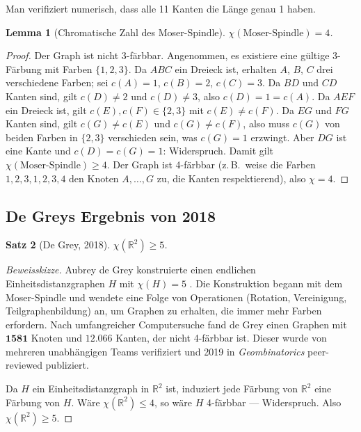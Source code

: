 \documentclass[12pt,a4paper]{amsart}
\newtheorem{theorem}{Satz}[section]
\newtheorem{lemma}[theorem]{Lemma}
\theoremstyle{definition}
\theoremstyle{remark}
\newcommand{\R}{\mathbb{R}}
\newcommand{\chr}{\chi}
\begin{document}
Man verifiziert numerisch, dass alle 11 Kanten die Länge genau 1 haben.

\begin{lemma}[Chromatische Zahl des Moser-Spindle]
$\chr(\text{Moser-Spindle}) = 4$.
\end{lemma}

\begin{proof}
Der Graph ist nicht 3-färbbar. Angenommen, es existiere eine gültige
3-Färbung mit Farben $\{1, 2, 3\}$. Da $ABC$ ein Dreieck ist, erhalten
$A$, $B$, $C$ drei verschiedene Farben; sei $c(A) = 1$, $c(B) = 2$,
$c(C) = 3$. Da $BD$ und $CD$ Kanten sind, gilt $c(D) \ne 2$ und
$c(D) \ne 3$, also $c(D) = 1 = c(A)$. Da $AEF$ ein Dreieck ist, gilt
$c(E), c(F) \in \{2, 3\}$ mit $c(E) \ne c(F)$. Da $EG$ und $FG$ Kanten
sind, gilt $c(G) \ne c(E)$ und $c(G) \ne c(F)$, also muss $c(G)$ von
beiden Farben in $\{2,3\}$ verschieden sein, was $c(G) = 1$ erzwingt.
Aber $DG$ ist eine Kante und $c(D) = c(G) = 1$: Widerspruch. Damit gilt
$\chr(\text{Moser-Spindle}) \ge 4$. Der Graph ist 4-färbbar (z.\,B.\ weise
die Farben $1,2,3,1,2,3,4$ den Knoten $A,\ldots,G$ zu, die Kanten
respektierend), also $\chr = 4$.
\end{proof}

\subsection{De Greys Ergebnis von 2018}

\begin{theorem}[De Grey, 2018]
\label{satz:degrey}
$\chr(\R^2) \ge 5$.
\end{theorem}

\begin{proof}[Beweisskizze]
Aubrey de Grey konstruierte einen endlichen Einheitsdistanzgraphen $H$ mit
$\chr(H) = 5$ \cite{degrey2018}. Die Konstruktion begann mit dem Moser-Spindle
und wendete eine Folge von Operationen (Rotation, Vereinigung, Teilgraphenbildung)
an, um Graphen zu erhalten, die immer mehr Farben erfordern. Nach umfangreicher
Computersuche fand de Grey einen Graphen mit $\mathbf{1581}$ Knoten und
$\mathbf{12.066}$ Kanten, der nicht 4-färbbar ist. Dieser wurde von mehreren
unabhängigen Teams verifiziert und 2019 in \emph{Geombinatorics}
peer-reviewed publiziert.

Da $H$ ein Einheitsdistanzgraph in $\R^2$ ist, induziert jede Färbung von
$\R^2$ eine Färbung von $H$. Wäre $\chr(\R^2) \le 4$, so wäre $H$
4-färbbar --- Widerspruch. Also $\chr(\R^2) \ge 5$.
\end{proof}
\end{document}
